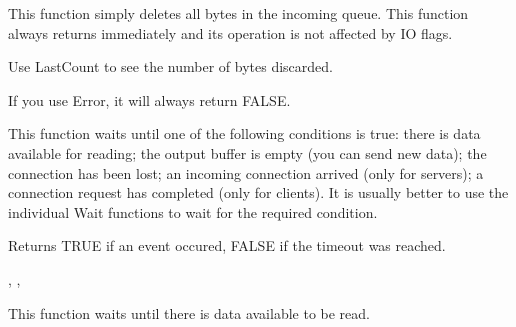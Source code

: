 This function simply deletes all bytes in the incoming queue. This function
always returns immediately and its operation is not affected by IO flags.

Use LastCount to see the number of bytes discarded.

If you use Error, it will always return FALSE.

\label{wxsocketbasewait}


This function waits until one of the following conditions is true: there
is data available for reading; the output buffer is empty (you can send
new data); the connection has been lost; an incoming connection arrived
(only for servers); a connection request has completed (only for clients).
It is usually better to use the individual Wait functions to wait for the
required condition.





Returns TRUE if an event occured, FALSE if the timeout was reached.


, 
, 

%
%
\label{wxsocketbasewaitforread}


This function waits until there is data available to be read.




